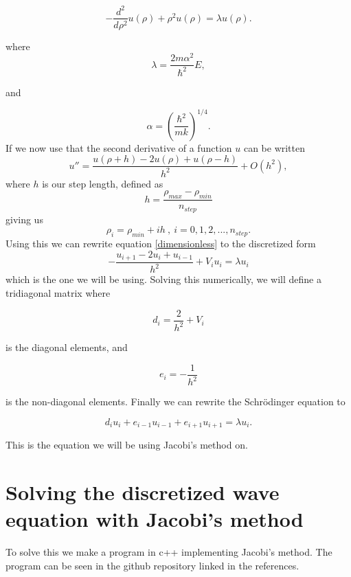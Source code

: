 \documentclass{aa}   %
\begin{document}
\begin{equation}
  -\frac{d^2}{d\rho^2} u(\rho) + \rho^2u(\rho)  = \lambda u(\rho). 
\end{equation}\label{dimensionless}

where 
\begin{equation}
\lambda = \frac{2m\alpha^2}{\hbar^2}E,
\end{equation}

and 

\begin{equation}
\alpha = \left(\frac{\hbar^2}{mk}\right)^{1/4}.
\end{equation}
If we now use that the second derivative of a function $u$ can be written
\begin{equation}
    u''=\frac{u(\rho+h) -2u(\rho) +u(\rho-h)}{h^2} +O(h^2),
\end{equation}
where $h$ is our step length, defined as 
\begin{equation}
 h = \frac{\rho_{max}-\rho_{min}}{n_{step}}
\end{equation}
giving us 
\begin{equation}
 \rho_i = \rho_{min} +ih~,~i=0,1,2,...,n_{step}.
\end{equation}
Using this we can rewrite equation \ref{dimensionless} to the discretized form
\begin{equation}
 -\frac{u_{i+1} -2u_i +u_{i-1} }{h^2}+V_iu_i  = \lambda u_i
\end{equation}
which is the one we will be using. Solving this numerically, we will define a tridiagonal matrix where 

\begin{equation}
 d_i=\frac{2}{h^2}+V_i
\end{equation}

is the diagonal elements, and

\begin{equation}
 e_i=-\frac{1}{h^2}
\end{equation}

is the non-diagonal elements. Finally we can rewrite the Schrödinger equation to

\begin{equation}
 d_iu_i+e_{i-1}u_{i-1}+e_{i+1}u_{i+1}  = \lambda u_i.
\end{equation}

This is the equation we will be using Jacobi's method on.
\section{Solving the discretized wave equation with Jacobi's method}   \label{sec:Saha}
To solve this we make a program in c++ implementing Jacobi's method.
The program can be seen in the github repository linked in the references.
\end{document}
